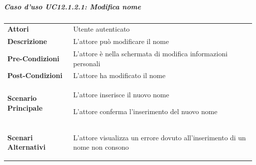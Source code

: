 \subparagraph{Caso d'uso UC12.1.2.1: Modifica nome}
\label{UC12_1_2_1}
\begin{minipage}{\linewidth}
	\begin{tabular}{ l | p{11cm}}
		\hline
		\rowcolor{Gray}
		\multicolumn{2}{c}{UC12.1.2.1 - Modifica nome} \\
		\hline
		\textbf{Attori} & Utente autenticato \\
		\textbf{Descrizione} & L'attore può modificare il nome\\
		\textbf{Pre-Condizioni} & L'attore è nella schermata di modifica informazioni personali\\
		\textbf{Post-Condizioni} & L'attore ha modificato il nome \\
		\textbf{Scenario Principale} & 
		\begin{enumerate*}[label=(\arabic*.),itemjoin={\newline}]
			\item L'attore inserisce il nuovo nome
			\item L'attore conferma l'inserimento del nuovo nome
		\end{enumerate*}\\
		\textbf{Scenari Alternativi} & 
		\begin{enumerate*}[label=(\arabic*.),itemjoin={\newline}]
			\item L'attore visualizza un errore dovuto all'inserimento di un nome non consono
		\end{enumerate*}
	\end{tabular}
\end{minipage}

